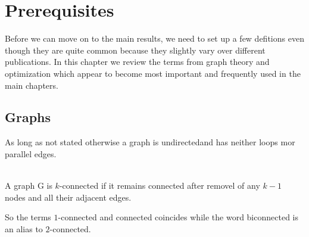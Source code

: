 \chapter{Prerequisites}
Before we can move on to the main results, we need to set up a few defitions even though they are quite common because they slightly vary over different publications. In this chapter we review the terms from graph theory and optimization which appear to become most important and frequently used in the main chapters.

\section{Graphs}
As long as not stated otherwise a graph is undirectedand has neither loops mor parallel edges.

\begin{definition} [\(k\)-connected]\label{def:k_connected}\ \\
  A graph G is \(k\)-connected if it remains connected after removel of any \(k-1\) nodes and all their adjacent edges.
\end{definition}

So the terms \(1\)-connected and connected coincides while the word \glqq{} biconnected \grqq{} is an alias to \(2\)-connected.